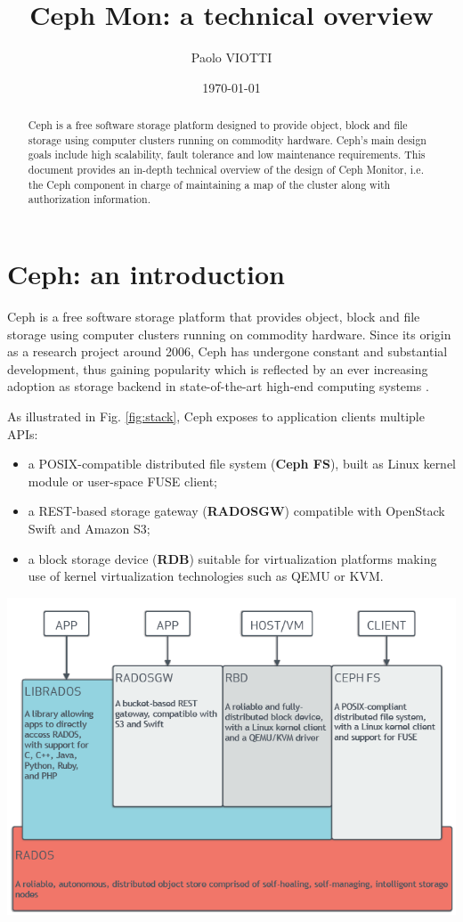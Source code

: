 \documentclass{article}
\title{Ceph Mon: a technical overview}
\author{Paolo VIOTTI}
\date{\today}
\begin{document}
\maketitle

\begin{abstract}
Ceph is a free software storage platform designed to provide object, block and file storage 
using computer clusters running on commodity hardware. 
Ceph's main design goals include high scalability, fault tolerance and low maintenance requirements.
This document provides an in-depth technical overview of the design of Ceph Monitor, 
i.e. the Ceph component in charge of maintaining a map of the cluster along with authorization information.
\end{abstract}

\section{Ceph: an introduction}
Ceph \cite{ceph} is a free software storage platform that provides object, block and file storage 
using computer clusters running on commodity hardware. 
Since its origin as a research project around 2006, 
Ceph has undergone constant and substantial development,
thus gaining popularity which is reflected by an ever increasing adoption as storage backend in state-of-the-art
high-end computing systems \cite{ceph-openstack}.

As illustrated in Fig. \ref{fig:stack}, Ceph exposes to application clients multiple APIs: 
\begin{itemize}
	\item a POSIX-compatible distributed file system (\textbf{Ceph FS}), built as Linux kernel module or user-space FUSE client;
	\item a REST-based storage gateway (\textbf{RADOSGW}) compatible with OpenStack Swift and Amazon S3;
	\item a block storage device (\textbf{RDB}) suitable for virtualization platforms making use of kernel 
	virtualization technologies such as QEMU or KVM.
\end{itemize}

\begin{center}
	\includegraphics[scale=0.35]{figs/ceph-stack.png}
	\label{fig:stack}
\end{center}
\end{document}
